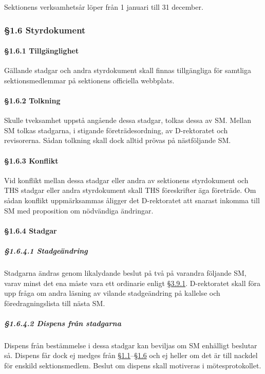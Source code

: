 Sektionens verksamhetsår löper från 1 januari till 31 december.

\subsubsection{§1.6 Styrdokument}

\paragraph{§1.6.1 Tillgänglighet}

Gällande stadgar och andra styrdokument skall finnas tillgängliga för samtliga sektionsmedlemmar på sektionens officiella webbplats.

\paragraph{§1.6.2 Tolkning}

Skulle tveksamhet uppstå angående dessa stadgar, tolkas dessa av SM. Mellan SM tolkas stadgarna, i stigande företrädesordning, av D-rektoratet och revisorerna. Sådan tolkning skall dock alltid prövas på nästföljande SM.

\paragraph{§1.6.3 Konflikt}

Vid konflikt mellan dessa stadgar eller andra av sektionens styrdokument och THS stadgar eller andra styrdokument skall THS föreskrifter äga företräde. Om sådan konflikt uppmärksammas åligger det D-rektoratet att snarast inkomma till SM med proposition om nödvändiga ändringar.

\paragraph{§1.6.4 Stadgar}

\subparagraph{§1.6.4.1 Stadgeändring}

Stadgarna ändras genom likalydande beslut på två på varandra följande SM, varav minst det ena måste vara ett ordinarie enligt \href{#sammantraden}{§3.9.1}. D-rektoratet skall föra upp fråga om andra läsning av vilande stadgeändring på kallelse och föredragningslista till nästa SM.

\subparagraph{§1.6.4.2 Dispens från stadgarna}

Dispens från bestämmelse i dessa stadgar kan beviljas om SM enhälligt beslutar så. Dispens får dock ej medges från \href{#namn}{§1.1}--\href{#styrdokument}{§1.6} och ej heller om det är till nackdel för enskild sektionsmedlem. Beslut om dispens skall motiveras i mötesprotokollet.


